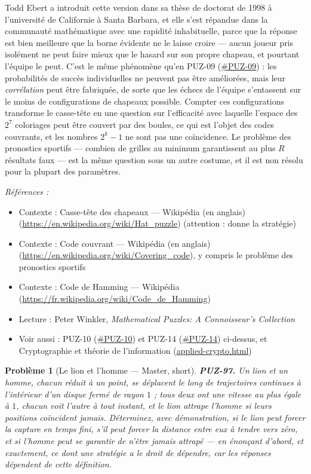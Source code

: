\documentclass[11pt]{article}
\newtheorem{problem}{Problème}
\newenvironment{refs}{\par\small\noindent\emph{Références :}\begin{itemize}\setlength\itemsep{0pt}}{\end{itemize}\normalsize}
\begin{document}
\noindent Todd Ebert a introduit cette version dans sa thèse de doctorat de 1998 à
l'université de Californie à Santa Barbara, et elle s'est répandue dans la communauté
mathématique avec une rapidité inhabituelle, parce que la réponse est bien meilleure que la
borne évidente ne le laisse croire --- aucun joueur pris isolément ne peut faire mieux que le
hasard sur son propre chapeau, et pourtant l'équipe le peut. C'est le même phénomène qu'en
PUZ-09 (\url{#PUZ-09}) : les probabilités de succès individuelles ne peuvent pas être
améliorées, mais leur \textit{corrélation} peut être fabriquée, de sorte que les échecs de
l'équipe s'entassent sur le moins de configurations de chapeaux possible. Compter ces
configurations transforme le casse-tête en une question sur l'efficacité avec laquelle
l'espace des $ 2^{7} $ coloriages peut être couvert par des boules, ce qui est l'objet des
codes couvrants, et les nombres $ 2^{k}-1 $ ne sont pas une coïncidence. Le problème des
pronostics sportifs --- combien de grilles au minimum garantissent au plus $ R $ résultats
faux --- est la même question sous un autre costume, et il est non résolu pour la plupart des
paramètres.

\begin{refs}
\item Contexte : Casse-tête des chapeaux --- Wikipédia (en anglais) (\url{https://en.wikipedia.org/wiki/Hat_puzzle}) (attention : donne la stratégie)
\item Contexte : Code couvrant --- Wikipédia (en anglais) (\url{https://en.wikipedia.org/wiki/Covering_code}), y compris le problème des pronostics sportifs
\item Contexte : Code de Hamming --- Wikipédia (\url{https://fr.wikipedia.org/wiki/Code_de_Hamming})
\item Lecture : Peter Winkler, \textit{Mathematical Puzzles: A Connoisseur's Collection}
\item Voir aussi : PUZ-10 (\url{#PUZ-10}) et PUZ-14 (\url{#PUZ-14}) ci-dessus, et Cryptographie et théorie de l'information (\url{applied-crypto.html})
\end{refs}

\bigskip

\begin{problem}[{Le lion et l'homme --- Master, short}]
\textbf{PUZ-97.} Un lion et un homme, chacun réduit à un point, se
déplacent le long de trajectoires continues à l'intérieur d'un disque fermé de rayon
$ 1 $ ; tous deux ont une vitesse au plus égale à $ 1 $, chacun voit l'autre à tout
instant, et le lion attrape l'homme si leurs positions coïncident jamais. Déterminez, avec
démonstration, si le lion peut forcer la capture en temps fini, s'il peut forcer la distance
entre eux à tendre vers zéro, et si l'homme peut se garantir de n'être jamais attrapé --- en
énonçant d'abord, et exactement, ce dont une stratégie a le droit de dépendre, car les
réponses dépendent de cette définition.
\end{problem}
\end{document}
